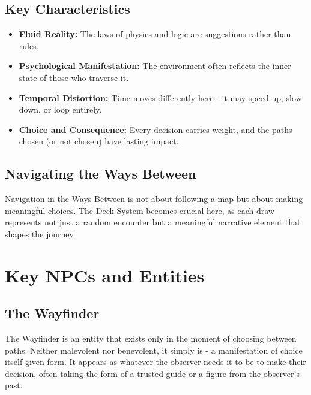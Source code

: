 \documentclass[11pt]{article}
\begin{document}
\subsection{Key Characteristics}

\begin{itemize}
\item \textbf{Fluid Reality:} The laws of physics and logic are suggestions rather than rules.
\item \textbf{Psychological Manifestation:} The environment often reflects the inner state of those who traverse it.
\item \textbf{Temporal Distortion:} Time moves differently here - it may speed up, slow down, or loop entirely.
\item \textbf{Choice and Consequence:} Every decision carries weight, and the paths chosen (or not chosen) have lasting impact.
\end{itemize}

\subsection{Navigating the Ways Between}

Navigation in the Ways Between is not about following a map but about making meaningful choices. The Deck System becomes crucial here, as each draw represents not just a random encounter but a meaningful narrative element that shapes the journey.

\section{Key NPCs and Entities}

\subsection{The Wayfinder}

The Wayfinder is an entity that exists only in the moment of choosing between paths. Neither malevolent nor benevolent, it simply is - a manifestation of choice itself given form. It appears as whatever the observer needs it to be to make their decision, often taking the form of a trusted guide or a figure from the observer's past.
\end{document}
